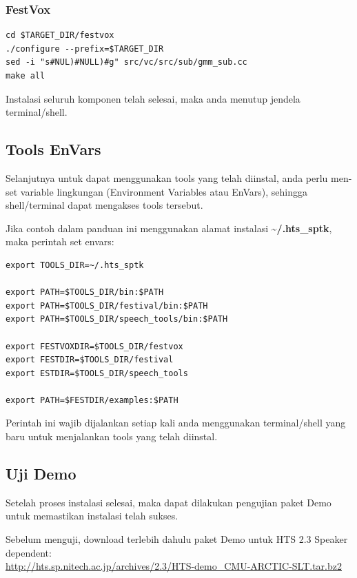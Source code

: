 \documentclass[12pt,]{article}
\begin{document}
	\subsubsection{FestVox}
	\begin{verbatim}
cd $TARGET_DIR/festvox
./configure --prefix=$TARGET_DIR
sed -i "s#NUL)#NULL)#g" src/vc/src/sub/gmm_sub.cc
make all
	\end{verbatim}
	
	Instalasi seluruh komponen telah selesai, maka anda menutup jendela terminal/shell.
	
	\newpage
	\subsection{Tools EnVars}
	
	Selanjutnya untuk dapat menggunakan tools yang telah diinstal,
	anda perlu men-set variable lingkungan (Environment Variables atau EnVars),
	sehingga shell/terminal dapat mengakses tools tersebut.
	
	Jika contoh dalam panduan ini menggunakan alamat instalasi \textbf{\textasciitilde/.hts\_sptk},
	maka perintah set envars:
	
	\begin{verbatim}
export TOOLS_DIR=~/.hts_sptk

export PATH=$TOOLS_DIR/bin:$PATH
export PATH=$TOOLS_DIR/festival/bin:$PATH
export PATH=$TOOLS_DIR/speech_tools/bin:$PATH

export FESTVOXDIR=$TOOLS_DIR/festvox
export FESTDIR=$TOOLS_DIR/festival
export ESTDIR=$TOOLS_DIR/speech_tools

export PATH=$FESTDIR/examples:$PATH
	\end{verbatim}
	
	Perintah ini wajib dijalankan setiap kali anda menggunakan terminal/shell yang baru untuk menjalankan tools yang telah diinstal.

	\subsection{Uji Demo}
	
	Setelah proses instalasi selesai, maka dapat dilakukan pengujian paket Demo untuk memastikan instalasi telah sukses.
	
	Sebelum menguji, download terlebih dahulu paket Demo untuk HTS 2.3 Speaker dependent:\\
	\url{http://hts.sp.nitech.ac.jp/archives/2.3/HTS-demo_CMU-ARCTIC-SLT.tar.bz2}
	
\end{document}
